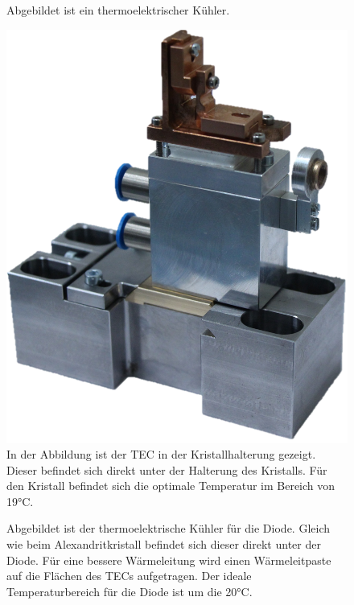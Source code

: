 \begin{figure}
    \centering
    \caption{Abgebildet ist ein thermoelektrischer Kühler.}
    \label{fig:tec_free_hw}
\end{figure}

\begin{figure}
    \centering
    \includegraphics[scale=0.3]{98_images/real_front_02.PNG}
    \caption{In der Abbildung ist der TEC in der Kristallhalterung gezeigt. Dieser befindet sich direkt unter der Halterung des Kristalls. Für den Kristall befindet sich die optimale Temperatur im Bereich von 19°C.}
    \label{fig:tec_cr_hw}
\end{figure}

\begin{figure}
    \centering
    \caption{Abgebildet ist der thermoelektrische Kühler für die Diode. Gleich wie beim Alexandritkristall befindet sich dieser direkt unter der Diode. Für eine bessere Wärmeleitung wird einen Wärmeleitpaste auf die Flächen des TECs aufgetragen. Der ideale Temperaturbereich für die Diode ist um die 20°C.}
    \label{fig:tec_di_hw}
\end{figure}

